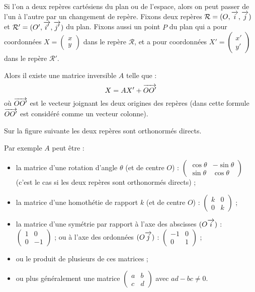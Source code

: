 \documentclass[class=report,crop=false]{standalone}
\begin{document}
Si l'on a deux repères cartésiens du plan ou de l'espace, alors on peut passer
de l'un à l'autre par un changement de repère. 
Fixons deux repères $\mathcal{R}= (O,\overrightarrow{i},\overrightarrow{j})$ et 
$\mathcal{R}'= (O',\overrightarrow{i'},\overrightarrow{j'})$ du plan. Fixons aussi un point $P$ du plan
qui a pour coordonnées $X = \left(\begin{smallmatrix}x\\y\end{smallmatrix}\right)$
dans le repère $\mathcal{R}$, et a pour coordonnées
$X' = \left(\begin{smallmatrix}x'\\y'\end{smallmatrix}\right)$
dans le repère $\mathcal{R}'$.

Alors il existe une matrice inversible $A$ telle que :
$$X = A X' + \overrightarrow{OO'}$$
où $\overrightarrow{OO'}$ est le vecteur joignant les deux origines des repères
(dans cette formule $\overrightarrow{OO'}$ est considéré comme un vecteur colonne).

Sur la figure suivante les deux repères sont orthonormés directs.

Par exemple $A$ peut être :
\begin{itemize}
  \item la matrice d'une rotation d'angle $\theta$ (et de centre $O$) :
$\begin{pmatrix}\cos\theta&-\sin\theta\\\sin\theta&\cos\theta\end{pmatrix}$ 
(c'est le cas si les deux repères sont orthonormés directs) ;
  \item la matrice d'une homothétie de rapport $k$ (et de centre $O$) :
$\begin{pmatrix}k&0\\0&k\end{pmatrix}$ ;
  \item la matrice d'une symétrie par rapport à l'axe des
  abscisses $(O\overrightarrow{i})$ : $\begin{pmatrix}1&0\\0&-1\end{pmatrix}$ ;
  ou à l'axe des ordonnées $(O\overrightarrow{j})$ : $\begin{pmatrix}-1&0\\0&1\end{pmatrix}$ ;
  \item ou le produit de plusieurs de ces matrices ;
  \item ou plus généralement une matrice $\begin{pmatrix}a&b\\c&d\end{pmatrix}$
  avec $ad-bc\neq 0$.
\end{itemize}
\end{document}
